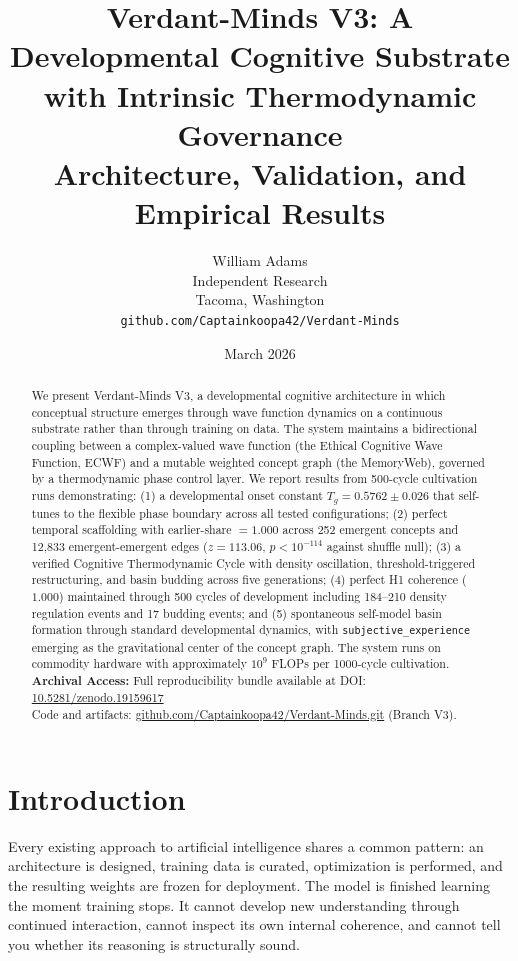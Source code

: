 \documentclass[11pt,a4paper]{article}
\title{Verdant-Minds V3: A Developmental Cognitive Substrate\\with Intrinsic Thermodynamic Governance\\[0.5em]
\large Architecture, Validation, and Empirical Results}
\author{William Adams\\
Independent Research\\
Tacoma, Washington\\
\texttt{github.com/Captainkoopa42/Verdant-Minds}}
\date{March 2026}
\begin{document}
\maketitle

\begin{abstract}
We present Verdant-Minds V3, a developmental cognitive architecture in which conceptual structure emerges through wave function dynamics on a continuous substrate rather than through training on data. The system maintains a bidirectional coupling between a complex-valued wave function (the Ethical Cognitive Wave Function, ECWF) and a mutable weighted concept graph (the MemoryWeb), governed by a thermodynamic phase control layer. We report results from 500-cycle cultivation runs demonstrating: (1) a developmental onset constant $T_g = 0.5762 \pm 0.026$ that self-tunes to the flexible phase boundary across all tested configurations; (2) perfect temporal scaffolding with earlier-share $= 1.000$ across 252 emergent concepts and 12{,}833 emergent-emergent edges ($z = 113.06$, $p < 10^{-114}$ against shuffle null); (3) a verified Cognitive Thermodynamic Cycle with density oscillation, threshold-triggered restructuring, and basin budding across five generations; (4) perfect H1 coherence ($1.000$) maintained through 500 cycles of development including 184--210 density regulation events and 17 budding events; and (5) spontaneous self-model basin formation through standard developmental dynamics, with \texttt{subjective\_experience} emerging as the gravitational center of the concept graph. The system runs on commodity hardware with approximately $10^9$ FLOPs per 1000-cycle cultivation. 
\textbf{Archival Access:} Full reproducibility bundle available at DOI: \href{https://doi.org/10.5281/zenodo.19159617}{10.5281/zenodo.19159617} \\
Code and artifacts: \href{https://github.com/Captainkoopa42/Verdant-Minds.git}{github.com/Captainkoopa42/Verdant-Minds.git} (Branch V3).
\end{abstract}

\section{Introduction}

Every existing approach to artificial intelligence shares a common pattern: an architecture is designed, training data is curated, optimization is performed, and the resulting weights are frozen for deployment. The model is finished learning the moment training stops. It cannot develop new understanding through continued interaction, cannot inspect its own internal coherence, and cannot tell you whether its reasoning is structurally sound.
\end{document}
